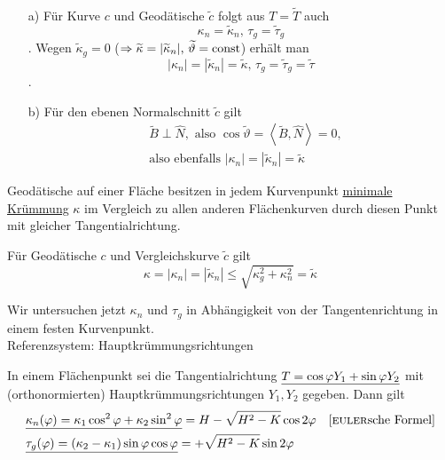 \begin{beweis} \(\)
 \begin{enumerate}  
  \item[a)] Für Kurve \(c\) und Geodätische \(\widetilde c\) folgt aus \(T = \widetilde T\) auch \[\kappa_n = \widetilde \kappa_n, \, \tau_g = \widetilde \tau_g\]. Wegen \(\widetilde \kappa_g = 0\) (\(\Rightarrow \widetilde \kappa = |\widetilde \kappa_n|, \, \widetilde \vartheta = \operatorname{const}\)) erhält man \[|\kappa_n| = |\widetilde \kappa_n| = \widetilde\kappa, \, \tau_g = \widetilde \tau_g = \widetilde \tau\].
  \item[b)] Für den ebenen Normalschnitt \(\widetilde c\) gilt 
   \begin{align*}
    &\widetilde B \perp \widehat N, \text{ also } \cos \widetilde \vartheta = \left\langle \widetilde B, \widehat N \right\rangle = 0, \\
    &\text{also ebenfalls } |\kappa_n| = |\widetilde \kappa_n | = \widetilde \kappa
   \end{align*}
   \end{enumerate}
  \end{beweis}
 

\begin{folgerung}
 Geodätische auf einer Fläche besitzen in jedem Kurvenpunkt \uline{minimale Krümmung} \(\kappa\) im Vergleich zu allen anderen Flächenkurven durch diesen Punkt mit gleicher Tangentialrichtung.
\end{folgerung}

\begin{beweis}
 Für Geodätische \(c\) und Vergleichskurve \(\widetilde c\) gilt
 \[
  \kappa = |\kappa_n | = |\widetilde \kappa_n | \le \sqrt{\kappa_g^2 + \kappa_n^2} = \widetilde \kappa
 \]
\end{beweis}

Wir untersuchen jetzt \(\kappa_n\) und \(\tau_g\) in Abhängigkeit von der Tangentenrichtung in einem festen Kurvenpunkt. \\ Referenzsystem: Hauptkrümmungsrichtungen

\begin{satz}\label{satz245}
 In einem Flächenpunkt sei die Tangentialrichtung \(\uline{T = \cos \varphi Y_1 + \sin \varphi Y_2}\) mit (orthonormierten) Hauptkrümmungsrichtungen \(Y_1, Y_2\) gegeben. Dann gilt
 \begin{align*}
  &\uline{\kappa_n(\varphi) = \kappa_1 \cos^2 \varphi + \kappa_2 \sin^2 \varphi} = H - \sqrt{H^2-K} \cos 2\varphi &\text{[\textsc{euler}sche Formel]}\\
  &\uline{\tau_g (\varphi) = (\kappa_2 - \kappa_1) \sin \varphi \cos \varphi} = + \sqrt{H^2 - K} \sin 2 \varphi
 \end{align*}
\end{satz}

